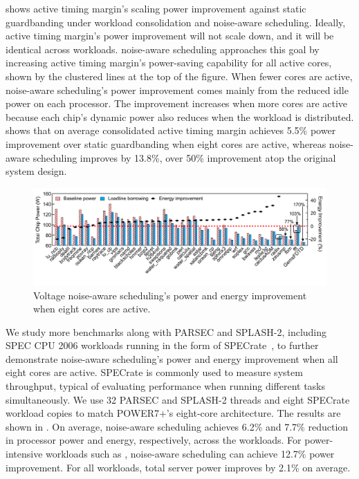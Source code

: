  shows active timing margin's scaling power improvement against static guardbanding under workload consolidation and noise-aware scheduling. Ideally, active timing margin's power improvement will not scale down, and it will be identical across workloads. noise-aware scheduling approaches this goal by increasing active timing margin's power-saving capability for all active cores, shown by the clustered lines at the top of the figure. When fewer cores are active, noise-aware scheduling's power improvement comes mainly from the reduced idle power on each processor. The improvement increases when more cores are active because each chip's dynamic power also reduces when the workload is distributed.  shows that on average consolidated active timing margin achieves 5.5\% power improvement over static guardbanding when eight cores are active, whereas noise-aware scheduling improves by 13.8\%, over 50\% improvement atop the original system design.

\begin{figure}
  \centering
  \includegraphics[trim=0 0 0 0,clip,width=\linewidth]{graphs/voltage/split_benefits_all.pdf}
    \caption{Voltage noise-aware scheduling's power and energy improvement when eight cores are active.}
    \label{fig:ll-borrow-8core-normal}
\end{figure}

We study more benchmarks along with PARSEC and SPLASH-2, including SPEC CPU 2006 workloads running in the form of SPECrate~\cite{SPEC2006}, to further demonstrate noise-aware scheduling's power and energy improvement when all eight cores are active. SPECrate is commonly used to measure system throughput, typical of evaluating performance when running different tasks simultaneously. We use 32 PARSEC and SPLASH-2 threads and eight SPECrate workload copies to match POWER7+'s eight-core architecture. The results are shown in . On average, noise-aware scheduling achieves 6.2\% and 7.7\% reduction in processor power and energy, respectively, across the workloads. For power-intensive workloads such as , noise-aware scheduling can achieve 12.7\% power improvement. For all workloads, total server power improves by 2.1\% on average.

